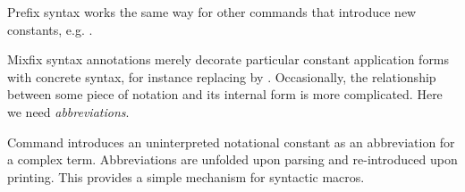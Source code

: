 \begin{isabellebody}
\begin{isamarkuptext}
  Prefix syntax works the same way for other commands that introduce new constants, e.g. .%
\end{isamarkuptext}%
\isamarkuptrue%
%
\isamarkuptrue%
%
\begin{isamarkuptext}%
Mixfix syntax annotations merely decorate particular constant
application forms with concrete syntax, for instance replacing
 by .  Occasionally, the relationship
between some piece of notation and its internal form is more
complicated.  Here we need \emph{abbreviations}.

Command  introduces an uninterpreted notational
constant as an abbreviation for a complex term. Abbreviations are
unfolded upon parsing and re-introduced upon printing. This provides a
simple mechanism for syntactic macros.


\end{isamarkuptext}
\end{isabellebody}
